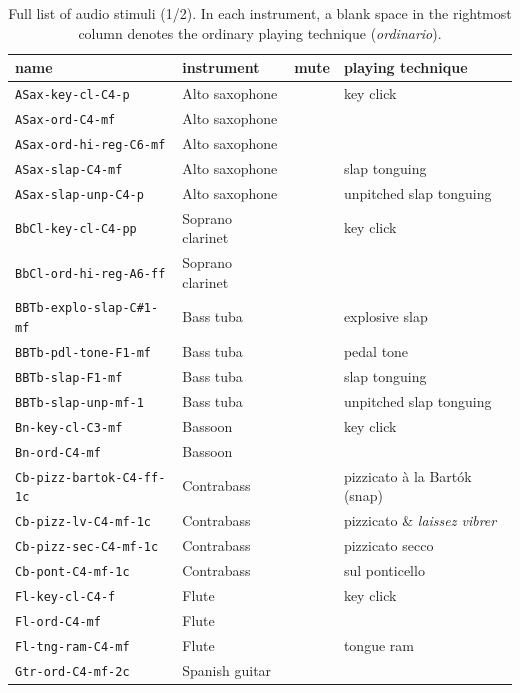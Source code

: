 \documentclass{bmcart}
\begin{document}
\begin{backmatter}
\begin{table}
\caption{Full list of audio stimuli (1/2). In each instrument, a blank space in the rightmost column denotes the ordinary playing technique (\emph{ordinario}).}
\label{tab:list1}
      \begin{tabular}{llll}
          name & instrument  & mute   &  playing technique \\ \hline \hline
        \texttt{ASax-key-cl-C4-p} & Alto saxophone & & key click \\
        \texttt{ASax-ord-C4-mf} & Alto saxophone &  &  \\
        \texttt{ASax-ord-hi-reg-C6-mf} & Alto saxophone &   & \\
        \texttt{ASax-slap-C4-mf} & Alto saxophone & & slap tonguing \\
        \texttt{ASax-slap-unp-C4-p} & Alto saxophone & & unpitched slap tonguing \\ \hline
        \texttt{BbCl-key-cl-C4-pp} & Soprano clarinet & & key click \\
        \texttt{BbCl-ord-hi-reg-A6-ff} & Soprano clarinet & & \\ \hline
        \texttt{BBTb-explo-slap-C\#1-mf} & Bass tuba &  & explosive slap \\
		\texttt{BBTb-pdl-tone-F1-mf} & Bass tuba & & pedal tone \\
		\texttt{BBTb-slap-F1-mf} & Bass tuba & & slap tonguing \\
		\texttt{BBTb-slap-unp-mf-1} & Bass tuba & & unpitched slap tonguing \\ \hline
		\texttt{Bn-key-cl-C3-mf} & Bassoon & & key click \\
		\texttt{Bn-ord-C4-mf} & Bassoon & & \\ \hline
		\texttt{Cb-pizz-bartok-C4-ff-1c} & Contrabass & & pizzicato \`a la Bart\'ok (snap) \\
		\texttt{Cb-pizz-lv-C4-mf-1c} & Contrabass & & pizzicato \& \emph{laissez vibrer} \\
        \texttt{Cb-pizz-sec-C4-mf-1c} & Contrabass & & pizzicato secco \\
        \texttt{Cb-pont-C4-mf-1c} & Contrabass & & sul ponticello \\ \hline
        \texttt{Fl-key-cl-C4-f} & Flute & & key click \\
        \texttt{Fl-ord-C4-mf} & Flute & & \\
        \texttt{Fl-tng-ram-C4-mf} & Flute & & tongue ram \\ \hline
        \texttt{Gtr-ord-C4-mf-2c} & Spanish guitar & & \\

\end{tabular}
\end{table}
\end{backmatter}
\end{document}
